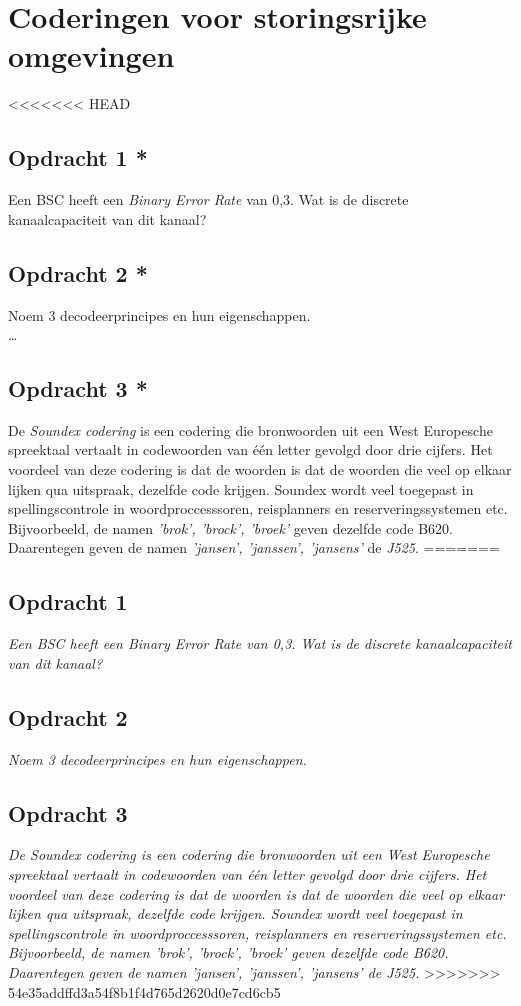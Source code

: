 \chapter{Coderingen voor storingsrijke omgevingen}

<<<<<<< HEAD
\section{Opdracht 1 *}
Een BSC heeft een \emph{Binary Error Rate} van 0,3. Wat is de discrete kanaalcapaciteit van dit kanaal?

\section{Opdracht 2 *}
Noem 3 decodeerprincipes en hun eigenschappen.\\
\ldots

\section{Opdracht 3 *}
De \emph{Soundex codering} is een codering die bronwoorden uit een West Europesche spreektaal vertaalt in codewoorden van \'{e}\'{e}n letter gevolgd door drie cijfers. Het voordeel van deze codering is dat de woorden is dat de woorden die veel op elkaar lijken qua uitspraak, dezelfde code krijgen. Soundex wordt veel toegepast in spellingscontrole in woordproccesssoren, reisplanners en reserveringssystemen etc. Bijvoorbeeld, de namen \emph{'brok', 'brock', 'broek'} geven dezelfde code B620. Daarentegen geven de namen \emph{'jansen', 'janssen', 'jansens'} de \emph{J525}.
=======
\section{Opdracht 1}
\emph{Een BSC heeft een \emph{Binary Error Rate} van 0,3. Wat is de discrete kanaalcapaciteit van dit kanaal?}

\section{Opdracht 2}
\emph{Noem 3 decodeerprincipes en hun eigenschappen.}

\section{Opdracht 3}
\emph{De \emph{Soundex codering} is een codering die bronwoorden uit een West Europesche spreektaal vertaalt in codewoorden van \'{e}\'{e}n letter gevolgd door drie cijfers. Het voordeel van deze codering is dat de woorden is dat de woorden die veel op elkaar lijken qua uitspraak, dezelfde code krijgen. Soundex wordt veel toegepast in spellingscontrole in woordproccesssoren, reisplanners en reserveringssystemen etc. Bijvoorbeeld, de namen \emph{'brok', 'brock', 'broek'} geven dezelfde code B620. Daarentegen geven de namen \emph{'jansen', 'janssen', 'jansens'} de \emph{J525}.}
>>>>>>> 54e35addffd3a54f8b1f4d765d2620d0e7cd6cb5

